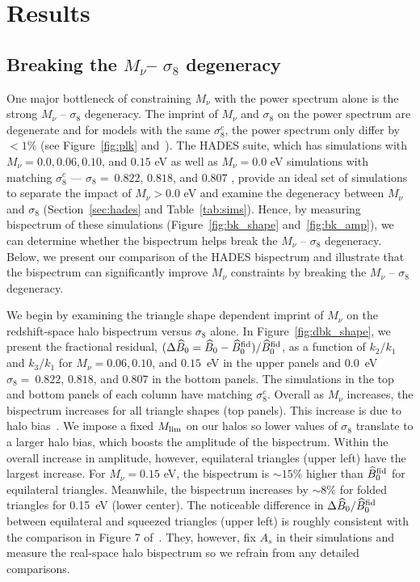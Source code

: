 \documentclass[12pt, letterpaper, preprint]{aastex62}
\newcommand{\smnu}{M_\nu}
\newcommand{\sig}{\sigma_8}
\newcommand{\BOk}{\widehat{B}_0}
\begin{document}
\section{Results} \label{sec:results} 
\subsection{Breaking the $\smnu$-- $\sig$ degeneracy} \label{sec:mnusig}
One major bottleneck of constraining $\smnu$ with the power spectrum alone is the 
strong $\smnu$ -- $\sig$ degeneracy. The imprint of $\smnu$ and $\sig$ on the power 
spectrum are degenerate and for models with the same $\sig^c$, the power spectrum
only differ by $< 1\%$ (see Figure~\ref{fig:plk} and~\citealt{villaescusa-navarro2018}). 
The HADES suite, which has simulations with $\smnu = 0.0, 0.06, 0.10$, 
and $0.15$ eV as well as $\smnu = 0.0$ eV simulations with matching $\sig^{c}$ --- 
$\sig{=}~0.822$, $0.818$, and $0.807$ , provide an ideal set of simulations to 
separate the impact of $\smnu > 0.0$ eV and examine the degeneracy between 
$\smnu$ and $\sig$ (Section~\ref{sec:hades} and Table~\ref{tab:sims}). Hence, by 
measuring bispectrum of these simulations (Figure~\ref{fig:bk_shape} and~\ref{fig:bk_amp}), 
we can determine whether the bispectrum helps break the $\smnu$ -- $\sig$ 
degeneracy. Below, we present our comparison of the HADES bispectrum and 
illustrate that the bispectrum can significantly improve $\smnu$ constraints 
by breaking the $\smnu$ -- $\sig$ degeneracy. 

We begin by examining the triangle shape dependent imprint of $\smnu$ on the 
redshift-space halo bispectrum versus $\sig$ alone. In Figure~\ref{fig:dbk_shape}, 
we present the fractional residual, $(\Delta \BOk = \BOk - \BOk^{\rm fid})/\BOk^{\rm fid}$,
as a function of $k_2/k_1$ and $k_3/k_1$ for $\smnu=0.06, 0.10$, and $0.15$~eV 
in the upper panels and 0.0~eV $\sig{=}~0.822$, $0.818$, and $0.807$ in the 
bottom panels. The simulations in the top and bottom panels of each column 
have matching $\sig^{c}$. Overall as $\smnu$ increases, the bispectrum increases 
for all triangle shapes (top panels). This increase is due to halo 
bias~\citep[][; see also Figure~\ref{fig:plk}]{villaescusa-navarro2018}. We 
impose a fixed $M_{\rm lim}$ on our halos so lower values of $\sig$ translate 
to a larger halo bias, which boosts the amplitude of the bispectrum. Within the 
overall increase in amplitude, however, equilateral triangles (upper left) have 
the largest increase. For $\smnu=0.15$ eV, the bispectrum is $\sim 15\%$ higher 
than $\BOk^{\rm fid}$ for equilateral triangles. Meanwhile, the bispectrum increases 
by $\sim 8\%$ for folded triangles for 0.15~eV (lower center). The noticeable 
difference in $\Delta \BOk/\BOk^{\rm fid}$ between equilateral and squeezed 
triangles (upper left) is roughly consistent with the comparison in Figure 7 
of~\cite{ruggeri2018}. They, however, fix $A_s$ in their simulations and 
measure the real-space halo bispectrum so we refrain from any detailed 
comparisons. 
\end{document}
